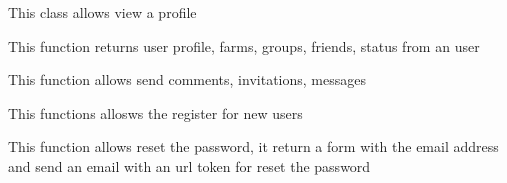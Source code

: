 \documentclass[letterpaper,10pt,english]{sphinxmanual}
\begin{document}
\begin{fulllineitems}
\label{modules/account:apps.account.views.ProfileView}
This class allows view a profile

\begin{fulllineitems}
\label{modules/account:apps.account.views.ProfileView.get_context_data}
This function returns user profile, farms, groups, friends, status from an user

\end{fulllineitems}


\begin{fulllineitems}
\label{modules/account:apps.account.views.ProfileView.post}
This function allows send comments, invitations, messages

\end{fulllineitems}


\end{fulllineitems}


\begin{fulllineitems}
\label{modules/account:apps.account.views.Register}
This functions allosws the register for new users

\end{fulllineitems}


\begin{fulllineitems}
\label{modules/account:apps.account.views.Reset}
This function allows reset the password, it return a form with the email address and send
an email with an url token for reset the password

\end{fulllineitems}

\end{document}
